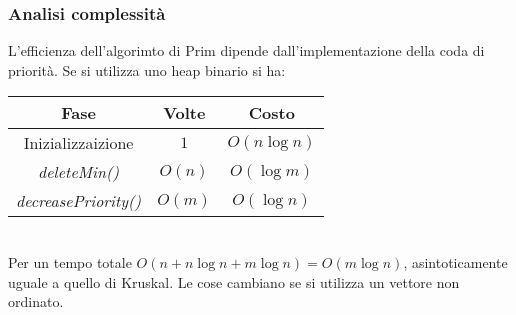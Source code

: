 \subsubsection{Analisi complessit\`a}
L'efficienza dell'algorimto di Prim dipende dall'implementazione della coda di priorit\`a. Se si utilizza uno heap binario si ha:\\
\begin{tabular}{|c|c|c|}
	\hline
	\textbf{Fase} & \textbf{Volte} & \textbf{Costo} \\
	\hline
	Inizializzaizione & $1$ & $O(n\log n)$ \\
	\hline
	\emph{deleteMin()} & $O(n)$ & $O(\log m)$ \\
	\hline
	\emph{decreasePriority()} & $O(m)$ & $O(\log n)$\\
	\hline
\end{tabular}\\
Per un tempo totale $O(n+n\log n+m\log n) = O(m\log n)$, asintoticamente uguale a quello di Kruskal. Le cose cambiano se si utilizza un vettore non ordinato.
